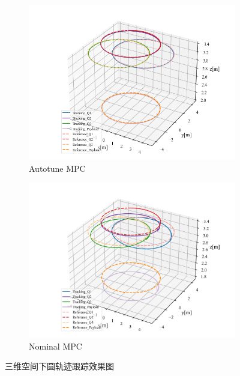 \documentclass[lang=chs, degree=master, blindreview=true, winfonts=true]{yanputhesis}
\begin{document}
\begin{figure}[hbt!]
    \centering
    \begin{subfigure}[b]{0.49\textwidth}
        \centering
        \includegraphics[width=\textwidth]{picture/kk2/3D.png} 
        \caption{Autotune MPC} 
        \label{3D1}
    \end{subfigure}
	\hspace{0.0\textwidth}
    \begin{subfigure}[b]{0.49\textwidth}
        \centering
        \includegraphics[width=\textwidth]{picture/kk2/plot3D.png} 
        \caption{Nominal MPC}  
        \label{3D2}
    \end{subfigure}
    \caption{三维空间下圆轨迹跟踪效果图}
    \label{combined3D}
\end{figure}
\end{document}

